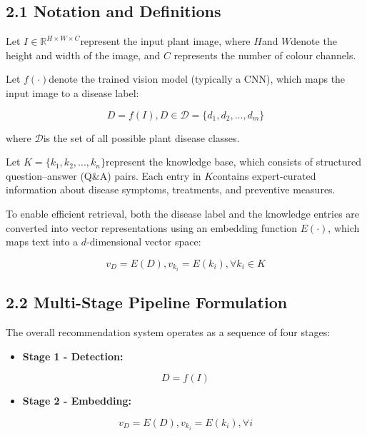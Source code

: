\subsection*{2.1 Notation and
Definitions}\label{notation-and-definitions}

Let \(I \in \mathbb{R}^{H \times W \times C}\)represent the input plant
image, where \(H\)and \(W\)denote the height and width of the image, and
\(C\) represents the number of colour channels.

Let \(f( \cdot )\)denote the trained vision model (typically a CNN),
which maps the input image to a disease label:

\[D = f(I),D \in \mathcal{D = \{}d_{1},d_{2},...,d_{m}\}
\]

where \(\mathcal{D}\)is the set of all possible plant disease classes.

Let \(K = \{ k_{1},k_{2},...,k_{n}\}\)represent the knowledge base,
which consists of structured question--answer (Q\&A) pairs. Each entry
in \(K\)contains expert-curated information about disease symptoms,
treatments, and preventive measures.

To enable efficient retrieval, both the disease label and the knowledge
entries are converted into vector representations using an embedding
function \(E( \cdot )\), which maps text into a \(d\)-dimensional vector
space:

\[v_{D} = E(D),v_{k_{i}} = E(k_{i}),\forall k_{i} \in K\]

\subsection*{2.2 Multi-Stage Pipeline
Formulation}\label{multi-stage-pipeline-formulation}

The overall recommendation system operates as a sequence of four stages:

\begin{itemize}
\item
  \textbf{Stage 1 - Detection:}
\end{itemize}

\[D = f(I)
\]

\begin{itemize}
\item
  \textbf{Stage 2 - Embedding:}
\end{itemize}

\[v_{D} = E(D),v_{k_{i}} = E(k_{i}),\forall i
\]

